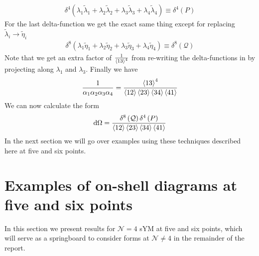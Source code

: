 \documentclass[letter,11pt]{article}
\begin{document}
\begin{equation}
	\begin{aligned}
		\delta^{4}(\lambda_1\tilde\lambda_1+\lambda_2\tilde\lambda_2+\lambda_3\tilde\lambda_3+\lambda_4\tilde\lambda_4)\equiv \delta^{4}\left(P\right)
	\end{aligned}
\end{equation}
For the last delta-function we get the exact same thing except for replacing $\tilde \lambda_i\to \tilde \eta_i$
\begin{equation}
	\begin{aligned}
		\delta^{8}(\lambda_1\tilde\eta_1+\lambda_2\tilde\eta_2+\lambda_3\tilde\eta_3+\lambda_4\tilde\eta_4)\equiv \delta^{8}\left(\mathcal{Q}\right)
	\end{aligned}
\end{equation}
Note that we get an extra factor of $\frac{1}{\expval{13}^4}$ from re-writing the delta-functions in by projecting along $\lambda_1$ and $\lambda_3$.
 Finally we have
\begin{equation}
	\begin{aligned}
		\frac{1}{\alpha_1 \alpha_2 \alpha_3 \alpha_4}=\frac{\expval{13}^4}{\expval{12}\expval{23}\expval{34}\expval{41}}
	\end{aligned}
\end{equation}
We can now calculate the form
\begin{equation}
	\begin{aligned}
		\dd \Omega =
		\frac{\delta^{8}\left(\mathcal{Q}\right)\delta^{4}\left(P\right)}{\expval{12}\expval{23}\expval{34}\expval{41}}
	\end{aligned}
\end{equation}
In the next section we will go over examples using these techniques described here at five and six points.
\newpage
\section{Examples of on-shell diagrams at five and six points\label{sec:examples}}
In this section we present results for $\mathcal{N}=4$ sYM at five and six points, which will serve as a springboard to consider forms at $\mathcal{N}\neq 4$ in the remainder of the report.
\end{document}
